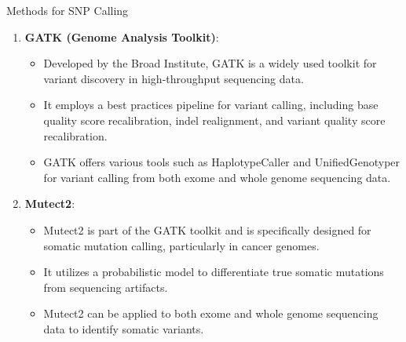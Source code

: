 \documentclass[
  ignorenonframetext,
]{beamer}
\providecommand{\tightlist}{%
  \setlength{\itemsep}{0pt}\setlength{\parskip}{0pt}}
\begin{document}
\begin{frame}{Methods for SNP Calling}
\label{methods-for-snp-calling}
\Large

\begin{enumerate}
\tightlist
\item
  \textbf{GATK (Genome Analysis Toolkit)}:

  \begin{itemize}
  \tightlist
  \item
    Developed by the Broad Institute, GATK is a widely used toolkit for
    variant discovery in high-throughput sequencing data.
  \item
    It employs a best practices pipeline for variant calling, including
    base quality score recalibration, indel realignment, and variant
    quality score recalibration.
  \item
    GATK offers various tools such as HaplotypeCaller and
    UnifiedGenotyper for variant calling from both exome and whole
    genome sequencing data.
  \end{itemize}
\item
  \textbf{Mutect2}:

  \begin{itemize}
  \tightlist
  \item
    Mutect2 is part of the GATK toolkit and is specifically designed for
    somatic mutation calling, particularly in cancer genomes.
  \item
    It utilizes a probabilistic model to differentiate true somatic
    mutations from sequencing artifacts.
  \item
    Mutect2 can be applied to both exome and whole genome sequencing
    data to identify somatic variants.
  \end{itemize}
\end{enumerate}
\end{frame}
\end{document}
